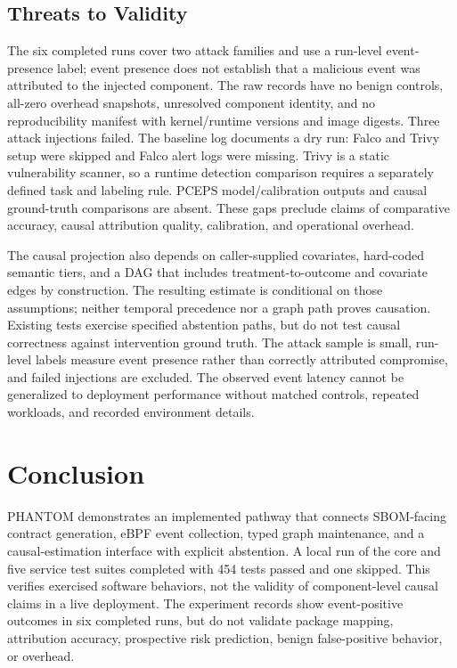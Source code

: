 \documentclass[conference]{IEEEtran}
\begin{document}
\subsection{Threats to Validity}
The six completed runs cover two attack families and use a run-level event-presence label; event presence does not establish that a malicious event was attributed to the injected component. The raw records have no benign controls, all-zero overhead snapshots, unresolved component identity, and no reproducibility manifest with kernel/runtime versions and image digests. Three attack injections failed. The baseline log documents a dry run: Falco and Trivy setup were skipped and Falco alert logs were missing. Trivy is a static vulnerability scanner, so a runtime detection comparison requires a separately defined task and labeling rule. PCEPS model/calibration outputs and causal ground-truth comparisons are absent. These gaps preclude claims of comparative accuracy, causal attribution quality, calibration, and operational overhead.

The causal projection also depends on caller-supplied covariates, hard-coded semantic tiers, and a DAG that includes treatment-to-outcome and covariate edges by construction. The resulting estimate is conditional on those assumptions; neither temporal precedence nor a graph path proves causation. Existing tests exercise specified abstention paths, but do not test causal correctness against intervention ground truth. The attack sample is small, run-level labels measure event presence rather than correctly attributed compromise, and failed injections are excluded. The observed event latency cannot be generalized to deployment performance without matched controls, repeated workloads, and recorded environment details.

\FloatBarrier
\section{Conclusion}
PHANTOM demonstrates an implemented pathway that connects SBOM-facing contract generation, eBPF event collection, typed graph maintenance, and a causal-estimation interface with explicit abstention. A local run of the core and five service test suites completed with 454 tests passed and one skipped. This verifies exercised software behaviors, not the validity of component-level causal claims in a live deployment. The experiment records show event-positive outcomes in six completed runs, but do not validate package mapping, attribution accuracy, prospective risk prediction, benign false-positive behavior, or overhead.
\end{document}
